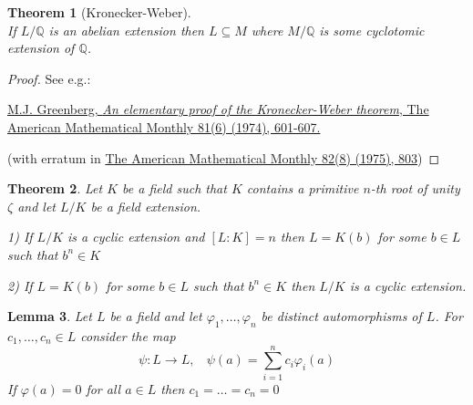 \documentclass[12pt, letterpaper, oneside]{article}
\theoremstyle{plain}
\newtheorem{theorem}{Theorem}[section]
\newtheorem{lemma}[theorem]{Lemma}
\theoremstyle{definition}
\newcommand{\Q}{{\mathbb Q}}
\newcommand{\vs}{\vskip 5mm}
\begin{document}
\begin{theorem}[Kronecker-Weber]\  \\
If $L/\Q$ is an abelian extension then $L\subseteq M$ where $M/\Q$ is some cyclotomic 
extension of $\Q$. 
\end{theorem}


\vs

\begin{proof}
See e.g.: 

\href{http://www.jstor.org/stable/2319208}
{
M.J. Greenberg, \emph{An elementary proof of the Kronecker-Weber theorem}, 
The American Mathematical Monthly 81(6) (1974), 601-607.
 }

 (with erratum in 
 \href{http://www.jstor.org/stable/2319794}{
  The American Mathematical Monthly 82(8) (1975), 803})
 
\end{proof}

\vs\vs


\begin{theorem}
\label{THM_LAGRANGECYCEXT}
Let $K$ be a field such that $K$ contains a primitive $n$-th root of unity $\zeta$
and let  $L/K$ be a field extension. 

1) If $L/K$ is a cyclic extension and $[L:K]=n$ then $L= K(b)$ for some $b\in L$ such 
that $b^{n}\in K$

2) If $L=K(b)$ for some $b\in L$ such that $b^{n}\in K$ then $L/K$ is a cyclic extension. 


\end{theorem}


\vs\vs

\begin{lemma}
\label{LEMMA_FIELDAUTOLININDEP}
Let $L$ be a field and let $\varphi_{1}, \dots, \varphi_{n}$ be distinct automorphisms of
$L$.  For $c_{1}, \dots, c_{n}\in L$ consider the map 
$$\psi \colon L \to L, \ \ \ \ \psi(a) = \sum_{i=1}^{n} c_{i}\varphi_{i}(a)$$
If $\varphi(a)=0$ for all $a\in L$ then $c_{1}=\dots = c_{n}=0$ 
\end{lemma}

\vs 
\end{document}
